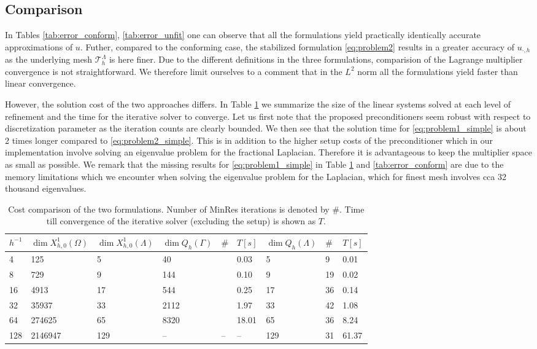 \subsection{Comparison}
In Tables \ref{tab:error_conform}, \ref{tab:error_unfit} one can observe that 
all the formulations yield practically identically accurate approximations of $u$.
Futher, compared to the conforming case, the stabilized formulation \eqref{eq:problem2}
results in a greater accuracy of $u_{\cdot, h}$ as the underlying mesh $\mathcal{T}^{\Lambda}_{h}$ is
here finer. Due to the different definitions in the three formulations, comparision of the Lagrange
multiplier convergence is not straightforward. We therefore limit ourselves to a
comment that in the $L^2$ norm all the formulations yield faster than linear convergence.


However, the solution
cost of the two approaches differs. In Table \ref{tab:cost} we summarize the
size of the linear systems solved at each level of refinement and the time
for the iterative solver to converge. Let us first note that the proposed
preconditioners seem robust with respect to discretization parameter as
the iteration counts are clearly bounded. We then see that the solution
time for \eqref{eq:problem1_simple} is about 2 times longer compared to
\eqref{eq:problem2_simple}. This is in addition to the higher setup costs
of the preconditioner which in our implementation involve solving an eigenvalue
problem for the fractional Laplacian. Therefore it is advantageous to keep
the multiplier space as small as possible. We remark that the missing
results for \eqref{eq:problem1_simple} in Table \ref{tab:cost} and \ref{tab:error_conform}
are due to the memory limitations which we encounter when solving the eigenvalue problem
for the Laplacian, which for finest mesh involves cca 32 thousand eigenvalues.
%
\begin{table}
  \scriptsize{
  \begin{center}
    \begin{tabular}{l|ll|lll|lll}
      \hline
      $h^{-1}$ & $\dim{X^1_{h, 0}(\Omega)}$ & $\dim{X^1_{h, 0}(\Lambda)}$ & $\dim{Q_h(\Gamma)}$ & $\#$ & $T\left[s\right]$ & $\dim{Q_h(\Lambda)}$ & $\#$ & $T\left[s\right]$\\
      \hline
4   &125     &5   &40    & &0.03  &5   &9  &0.01\\
8   &729     &9   &144   & &0.10  &9   &19 &0.02\\
16  &4913    &17  &544   & &0.25  &17  &36 &0.14\\
32  &35937   &33  &2112  & &1.97  &33  &42 &1.08\\
64  &274625  &65  &8320  & &18.01 &65  &36 &8.24\\
128 &2146947 &129 &--    &-- &--    &129 &31 &61.37\\
\hline
    \end{tabular}
    \end{center}
    }
  \caption{Cost comparison of the two formulations. Number of MinRes iterations
    is denoted by $\#$. Time till convergence of the iterative solver (excluding the setup) is shown
    as $T$.
  }
\label{tab:cost}
\end{table}

